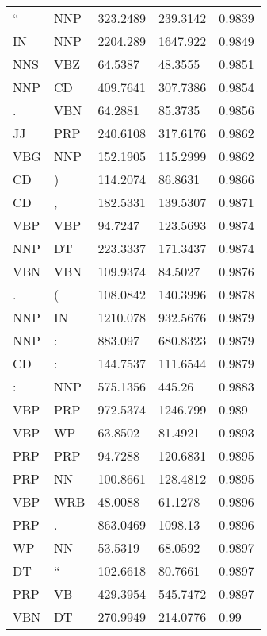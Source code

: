 \begin{table}[H]
\begin{tabular}{@{}lllll@{}}
		``    & NNP   & 323.2489 & 239.3142   & 0.9839  \\
		IN    & NNP   & 2204.289 & 1647.922   & 0.9849  \\
		NNS   & VBZ   & 64.5387  & 48.3555    & 0.9851  \\
		NNP   & CD    & 409.7641 & 307.7386   & 0.9854  \\
		.     & VBN   & 64.2881  & 85.3735    & 0.9856  \\
		JJ    & PRP   & 240.6108 & 317.6176   & 0.9862  \\
		VBG   & NNP   & 152.1905 & 115.2999   & 0.9862  \\
		CD    & )     & 114.2074 & 86.8631    & 0.9866  \\
		CD    & ,     & 182.5331 & 139.5307   & 0.9871  \\
		VBP   & VBP   & 94.7247  & 123.5693   & 0.9874  \\
		NNP   & DT    & 223.3337 & 171.3437   & 0.9874  \\
		VBN   & VBN   & 109.9374 & 84.5027    & 0.9876  \\
		.     & (     & 108.0842 & 140.3996   & 0.9878  \\
		NNP   & IN    & 1210.078 & 932.5676   & 0.9879  \\
		NNP   & :     & 883.097  & 680.8323   & 0.9879  \\
		CD    & :     & 144.7537 & 111.6544   & 0.9879  \\
		:     & NNP   & 575.1356 & 445.26     & 0.9883  \\
		VBP   & PRP   & 972.5374 & 1246.799   & 0.989   \\
		VBP   & WP    & 63.8502  & 81.4921    & 0.9893  \\
		PRP   & PRP   & 94.7288  & 120.6831   & 0.9895  \\
		PRP   & NN    & 100.8661 & 128.4812   & 0.9895  \\
		VBP   & WRB   & 48.0088  & 61.1278    & 0.9896  \\
		PRP   & .     & 863.0469 & 1098.13    & 0.9896  \\
		WP    & NN    & 53.5319  & 68.0592    & 0.9897  \\
		DT    & ``    & 102.6618 & 80.7661    & 0.9897  \\
		PRP   & VB    & 429.3954 & 545.7472   & 0.9897  \\
		VBN   & DT    & 270.9949 & 214.0776   & 0.99    \\ \bottomrule
	\end{tabular}
\end{table}

